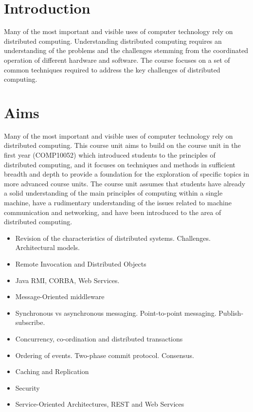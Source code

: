 \section*{Introduction}

Many of the most important and visible uses of computer technology rely on
distributed computing. Understanding distributed computing requires an
understanding of the problems and the challenges stemming from the coordinated
operation of different hardware and software. The course focuses on a set of
common techniques required to address the key challenges of distributed
computing.

\section*{Aims}

Many of the most important and visible uses of computer technology rely on
distributed computing. This course unit aims to build on the course unit in the
first year (COMP10052) which introduced students to the principles of
distributed computing, and it focuses on techniques and methods in sufficient
breadth and depth to provide a foundation for the exploration of specific topics
in more advanced course units. The course unit assumes that students have
already a solid understanding of the main principles of computing within a
single machine, have a rudimentary understanding of the issues related to
machine communication and networking, and have been introduced to the area of
distributed computing.

\begin{mymulticols}
  \begin{itemize}
    \item Revision of the characteristics of distributed systems. Challenges. Architectural models.
    \item Remote Invocation and Distributed Objects
    \item Java RMI, CORBA, Web Services.
    \item Message-Oriented middleware
    \item Synchronous vs asynchronous messaging. Point-to-point messaging. Publish-subscribe.
    \item Concurrency, co-ordination and distributed transactions
    \item Ordering of events. Two-phase commit protocol. Consensus.
    \item Caching and Replication
    \item Security
    \item Service-Oriented Architectures, REST and Web Services
  \end{itemize}
\end{mymulticols}

